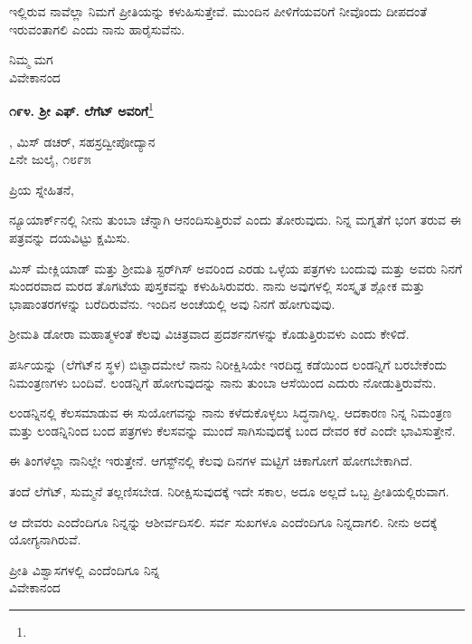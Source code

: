 ಇಲ್ಲಿರುವ ನಾವೆಲ್ಲಾ ನಿಮಗೆ ಪ್ರೀತಿಯನ್ನು ಕಳುಹಿಸುತ್ತೇವೆ. ಮುಂದಿನ ಪೀಳಿಗೆಯವರಿಗೆ ನೀವೊಂದು ದೀಪದಂತೆ ಇರುವಂತಾಗಲಿ ಎಂದು ನಾನು ಹಾರೈಸುವೆನು.

{\flushright
ನಿಮ್ಮ ಮಗ\\ವಿವೇಕಾನಂದ\par}

\begin{center}
\textbf{೧೯೪. ಶ‍್ರೀ ಎಫ್. ಲೆಗೆಟ್ ಅವರಿಗೆ}\footnote{}
\end{center}

\begin{flushright}
, ಮಿಸ್‌ ಡಚರ್‌, ಸಹಸ್ರದ್ವೀಪೋದ್ಯಾನ\\೭ನೇ ಜುಲೈ, ೧೮೯೫
\end{flushright}

\noindent
ಪ್ರಿಯ ಸ್ನೇಹಿತನೆ,

ನ್ಯೂಯಾರ್ಕ್‌ನಲ್ಲಿ ನೀನು ತುಂಬಾ ಚೆನ್ನಾಗಿ ಆನಂದಿಸುತ್ತಿರುವೆ ಎಂದು ತೋರುವುದು. ನಿನ್ನ ಮಗ್ನತೆಗೆ ಭಂಗ ತರುವ ಈ ಪತ್ರವನ್ನು ದಯವಿಟ್ಟು ಕ್ಷಮಿಸು.
\vspace{0.2cm}

ಮಿಸ್ ಮೇಕ್ಲಿಯಾಡ್ ಮತ್ತು ಶ‍್ರೀಮತಿ ಸ್ಟರ್‌ಗಿಸ್ ಅವರಿಂದ ಎರಡು ಒಳ್ಳೆಯ ಪತ್ರಗಳು ಬಂದುವು ಮತ್ತು ಅವರು ನಿನಗೆ ಸುಂದರವಾದ ಮರದ ತೊಗಟೆಯ  ಪುಸ್ತಕವನ್ನು ಕಳುಹಿಸಿರುವರು. ನಾನು ಅವುಗಳಲ್ಲಿ ಸಂಸ್ಕೃತ ಶ್ಲೋಕ ಮತ್ತು ಭಾಷಾಂತರಗಳನ್ನು ಬರೆದಿರುವೆನು. ಇಂದಿನ ಅಂಚೆಯಲ್ಲಿ ಅವು ನಿನಗೆ ಹೋಗುವುವು.
\vspace{0.2cm}

ಶ‍್ರೀಮತಿ ಡೋರಾ ಮಹಾತ್ಮಳಂತೆ ಕೆಲವು ವಿಚಿತ್ರವಾದ ಪ್ರದರ್ಶನಗಳನ್ನು ಕೊಡುತ್ತಿರುವಳು ಎಂದು ಕೇಳಿದೆ.
\vspace{0.2cm}

ಪರ್ಸಿಯನ್ನು (ಲೆಗೆಟ್‌ನ ಸ್ಥಳ) ಬಿಟ್ಟಾದಮೇಲೆ ನಾನು ನಿರೀಕ್ಷಿಸಿಯೇ ಇರದಿದ್ದ ಕಡೆಯಿಂದ ಲಂಡನ್ನಿಗೆ ಬರಬೇಕೆಂದು ನಿಮಂತ್ರಣಗಳು ಬಂದಿವೆ. ಲಂಡನ್ನಿಗೆ ಹೋಗುವುದನ್ನು ನಾನು ತುಂಬಾ ಆಸೆಯಿಂದ ಎದುರು ನೋಡುತ್ತಿರುವೆನು.
\vspace{0.2cm}

ಲಂಡನ್ನಿನಲ್ಲಿ ಕೆಲಸಮಾಡುವ ಈ ಸುಯೋಗವನ್ನು ನಾನು ಕಳೆದುಕೊಳ್ಳಲು ಸಿದ್ಧನಾಗಿಲ್ಲ. ಆದಕಾರಣ ನಿನ್ನ ನಿಮಂತ್ರಣ ಮತ್ತು ಲಂಡನ್ನಿನಿಂದ ಬಂದ ಪತ್ರಗಳು ಕೆಲಸವನ್ನು ಮುಂದೆ ಸಾಗಿಸುವುದಕ್ಕೆ ಬಂದ ದೇವರ ಕರೆ ಎಂದೇ ಭಾವಿಸುತ್ತೇನೆ.

ಈ ತಿಂಗಳೆಲ್ಲಾ ನಾನಿಲ್ಲೇ ಇರುತ್ತೇನೆ. ಆಗಸ್ಟ್‌ನಲ್ಲಿ ಕೆಲವು ದಿನಗಳ ಮಟ್ಟಿಗೆ ಚಿಕಾಗೋಗೆ ಹೋಗಬೇಕಾಗಿದೆ.

ತಂದೆ ಲೆಗೆಟ್, ಸುಮ್ಮನೆ ತಲ್ಲಣಿಸಬೇಡ. ನಿರೀಕ್ಷಿಸುವುದಕ್ಕೆ ಇದೇ ಸಕಾಲ, ಅದೂ ಅಲ್ಲದೆ ಒಬ್ಬ ಪ್ರೀತಿಯಲ್ಲಿರುವಾಗ.

ಆ ದೇವರು ಎಂದೆಂದಿಗೂ ನಿನ್ನನ್ನು ಆಶೀರ್ವದಿಸಲಿ. ಸರ್ವ ಸುಖಗಳೂ ಎಂದೆಂದಿಗೂ ನಿನ್ನದಾಗಲಿ. ನೀನು ಅದಕ್ಕೆ ಯೋಗ್ಯನಾಗಿರುವೆ.
\vspace{-0.3cm}

{\flushright
ಪ್ರೀತಿ ವಿಶ್ವಾಸಗಳಲ್ಲಿ ಎಂದೆಂದಿಗೂ ನಿನ್ನ\\ವಿವೇಕಾನಂದ\par}
\vspace{-0.4cm}

